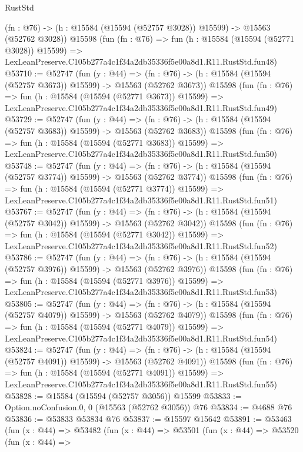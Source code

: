\begin{lexlean}{RustStd}
\begin{coremodule}
    (fn : @76) -> (h : @15584 (@15594 (@52757 @3028)) @15599) -> @15563 (@52762 @3028))
    @15598
    (fun (fn : @76) =>
    fun (h : @15584 (@15594 (@52771 @3028)) @15599) =>
    LexLeanPreserve.C105b277a4c1f34a2db35336f5e00a8d1.R11.RustStd.fun48)
@53710 := @52747
    (fun (y : @44) =>
    (fn : @76) -> (h : @15584 (@15594 (@52757 @3673)) @15599) -> @15563 (@52762 @3673))
    @15598
    (fun (fn : @76) =>
    fun (h : @15584 (@15594 (@52771 @3673)) @15599) =>
    LexLeanPreserve.C105b277a4c1f34a2db35336f5e00a8d1.R11.RustStd.fun49)
@53729 := @52747
    (fun (y : @44) =>
    (fn : @76) -> (h : @15584 (@15594 (@52757 @3683)) @15599) -> @15563 (@52762 @3683))
    @15598
    (fun (fn : @76) =>
    fun (h : @15584 (@15594 (@52771 @3683)) @15599) =>
    LexLeanPreserve.C105b277a4c1f34a2db35336f5e00a8d1.R11.RustStd.fun50)
@53748 := @52747
    (fun (y : @44) =>
    (fn : @76) -> (h : @15584 (@15594 (@52757 @3774)) @15599) -> @15563 (@52762 @3774))
    @15598
    (fun (fn : @76) =>
    fun (h : @15584 (@15594 (@52771 @3774)) @15599) =>
    LexLeanPreserve.C105b277a4c1f34a2db35336f5e00a8d1.R11.RustStd.fun51)
@53767 := @52747
    (fun (y : @44) =>
    (fn : @76) -> (h : @15584 (@15594 (@52757 @3042)) @15599) -> @15563 (@52762 @3042))
    @15598
    (fun (fn : @76) =>
    fun (h : @15584 (@15594 (@52771 @3042)) @15599) =>
    LexLeanPreserve.C105b277a4c1f34a2db35336f5e00a8d1.R11.RustStd.fun52)
@53786 := @52747
    (fun (y : @44) =>
    (fn : @76) -> (h : @15584 (@15594 (@52757 @3976)) @15599) -> @15563 (@52762 @3976))
    @15598
    (fun (fn : @76) =>
    fun (h : @15584 (@15594 (@52771 @3976)) @15599) =>
    LexLeanPreserve.C105b277a4c1f34a2db35336f5e00a8d1.R11.RustStd.fun53)
@53805 := @52747
    (fun (y : @44) =>
    (fn : @76) -> (h : @15584 (@15594 (@52757 @4079)) @15599) -> @15563 (@52762 @4079))
    @15598
    (fun (fn : @76) =>
    fun (h : @15584 (@15594 (@52771 @4079)) @15599) =>
    LexLeanPreserve.C105b277a4c1f34a2db35336f5e00a8d1.R11.RustStd.fun54)
@53824 := @52747
    (fun (y : @44) =>
    (fn : @76) -> (h : @15584 (@15594 (@52757 @4091)) @15599) -> @15563 (@52762 @4091))
    @15598
    (fun (fn : @76) =>
    fun (h : @15584 (@15594 (@52771 @4091)) @15599) =>
    LexLeanPreserve.C105b277a4c1f34a2db35336f5e00a8d1.R11.RustStd.fun55)
@53828 := @15584 (@15594 (@52757 @3056)) @15599
@53833 := Option.noConfusion.{0, 0} (@15563 (@52762 @3056)) @76
@53834 := @4688 @76
@53836 := @53833 @53834 @76
@53837 := @15597 @15642
@53891 := @53463
    (fun (x : @44) =>
    @53482
      (fun (x : @44) =>
      @53501
        (fun (x : @44) =>
        @53520
          (fun (x : @44) =>

\end{coremodule}
\end{lexlean}
